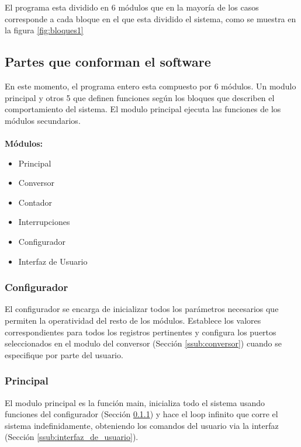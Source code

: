\documentclass{article}
\theoremstyle{definition}
\theoremstyle{remark}
\begin{document}
El programa esta dividido en 6 módulos que en la mayoría de los casos corresponde a cada bloque en el que esta dividido el sistema, como se muestra en la figura \ref{fig:bloques1}

\subsection{Partes que conforman el software} %
\label{sub:partes_que_conforman_el_software}

En este momento, el programa entero esta compuesto por 6 módulos. Un modulo principal y otros 5 que definen funciones según los bloques que describen el comportamiento del sistema. El modulo principal ejecuta las funciones de los módulos secundarios.

\paragraph{}
\textbf{Módulos:}
\begin{itemize}
  \item Principal
  \item Conversor
  \item Contador
  \item Interrupciones
  \item Configurador
  \item Interfaz de Usuario
\end{itemize}


\subsubsection{Configurador} %
\label{ssub:configurador}

El configurador se encarga de inicializar todos los parámetros necesarios que permiten la operatividad del resto de los módulos. Establece los valores correspondientes para todos los registros pertinentes y configura los puertos seleccionados en el modulo del conversor (Sección \ref{ssub:conversor}) cuando se especifique por parte del usuario.
\subsubsection{Principal}
El modulo principal es la función main, inicializa todo el sistema usando funciones del configurador (Sección \ref{ssub:configurador}) y hace el loop infinito que corre el sistema indefinidamente, obteniendo los comandos del usuario via la interfaz (Sección \ref{ssub:interfaz_de_usuario}).
\end{document}
